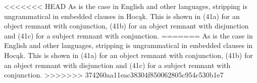 \documentclass[output=paper]{LSP/langsci}
\begin{document}
<<<<<<< HEAD
As is the case in English and other languages, stripping is ungrammatical in embedded clauses in Hocąk. This is shown in (41a) for an object remnant with conjunction, (41b) for an object remnant with disjunction and (41c) for a subject remnant with conjunction.
=======
As is the case in English and other languages, stripping is ungrammatical in embedded clauses in Hoc\k{a}k. This is shown in (41a) for an object remnant with conjunction, (41b) for an object remnant with disjunction and (41c) for a subject remnant with conjunction.
>>>>>>> 374260aa11eac38304f850062805c954c530b1e7

\begin{exe}
\ex
\begin{xlist}


\end{xlist}
\end{exe}
\end{document}
